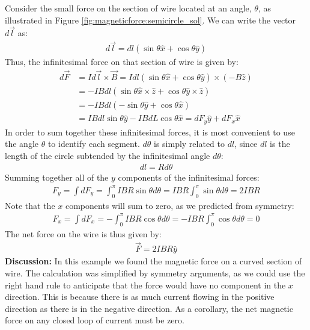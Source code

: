 \begin{example}
Consider the small force on the section of wire located at an angle, $\theta$, as illustrated in Figure \ref{fig:magneticforce:semicircle_sol}. We can write the vector $d\vec l$ as:
\begin{align*}
d\vec l = dl(\sin\theta\hat x + \cos\theta \hat y)
\end{align*}
Thus, the infinitesimal force on that section of wire is given by:
\begin{align*}
d\vec F &= I d\vec l \times \vec B = I dl(\sin\theta\hat x + \cos\theta \hat y)\times (-B\hat z)\\
&=-IBdl (\sin\theta\hat x \times \hat z + \cos\theta \hat y \times \hat z)\\
&=-IBdl (-\sin\theta \hat y + \cos\theta\hat x) \\
&= IBdl\sin\theta \hat y - IBdL\cos\theta \hat x = dF_y\hat y + dF_x \hat x
\end{align*} 
In order to sum together these infinitesimal forces, it is most convenient to use the angle $\theta$ to identify each segment. $d\theta$ is simply related to $dl$, since $dl$ is the length of the circle subtended by the infinitesimal angle $d\theta$:
\begin{align*}
dl = Rd\theta
\end{align*}
Summing together all of the $y$ components of the infinitesimal forces:
\begin{align*}
F_y = \int dF_y = \int_0^\pi IBR\sin\theta d\theta=IBR \int_0^\pi\sin\theta d\theta=2IBR
\end{align*}
Note that the $x$ components will sum to zero, as we predicted from symmetry:
\begin{align*}
F_x = \int dF_x = -\int_0^\pi IBR\cos\theta d\theta=-IBR \int_0^\pi\cos\theta d\theta=0
\end{align*}
The net force on the wire is thus given by:
\begin{align*}
\vec F = 2IBR\hat y
\end{align*}
\textbf{Discussion: }In this example we found the magnetic force on a curved section of wire. The calculation was simplified by symmetry arguments, as we could use the right hand rule to anticipate that the force would have no component in the $x$ direction. This is because there is as much current flowing in the positive direction as there is in the negative direction. As a corollary, the net magnetic force on any closed loop of current must be zero.
\end{example}

